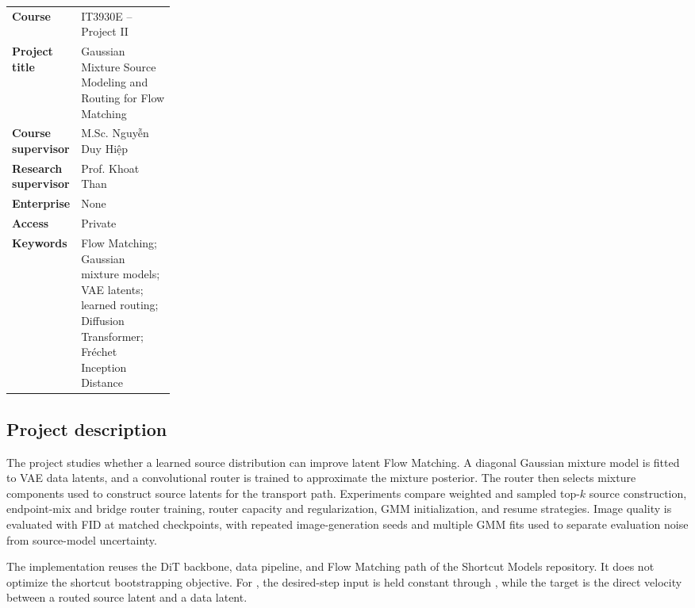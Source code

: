 \documentclass[11pt,a4paper]{article}
\newcommand{\metric}[1]{\texttt{\small\detokenize{#1}}}
\begin{document}
\begin{tabularx}{\linewidth}{@{}p{0.24\linewidth}Y@{}}
\toprule
\textbf{Course} & IT3930E -- Project II\\
\textbf{Project title} & Gaussian Mixture Source Modeling and Routing for
Flow Matching\\
\textbf{Course supervisor} &
\foreignlanguage{vietnamese}{M.Sc. Nguyễn Duy Hiệp}\\
\textbf{Research supervisor} & Prof. Khoat Than\\
\textbf{Enterprise} & None\\
\textbf{Access} & Private\\
\textbf{Keywords} & Flow Matching; Gaussian mixture models; VAE latents;
learned routing; Diffusion Transformer; Fréchet Inception Distance\\
\bottomrule
\end{tabularx}

\subsection*{Project description}

The project studies whether a learned source distribution can improve latent
Flow Matching. A diagonal Gaussian mixture model is fitted to VAE data
latents, and a convolutional router is trained to approximate the mixture
posterior. The router then selects mixture components used to construct source
latents for the transport path. Experiments compare weighted and sampled
top-\(k\) source construction, endpoint-mix and bridge router training, router
capacity and regularization, GMM initialization, and resume strategies. Image
quality is evaluated with FID at matched checkpoints, with repeated
image-generation seeds and multiple GMM fits used to separate evaluation
noise from source-model uncertainty.

The implementation reuses the DiT backbone, data pipeline, and Flow Matching
path of the Shortcut Models repository. It does not optimize the shortcut
bootstrapping objective. For \metric{train_type=gmm-tide}, the desired-step
input is held constant through \metric{ignore_dt=True}, while the target is the
direct velocity between a routed source latent and a data latent.

\newpage
\end{document}
